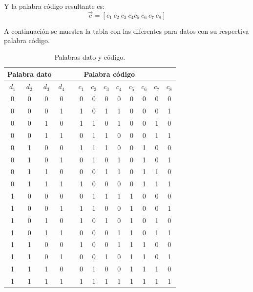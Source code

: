 \documentclass[12pt,letterpaper]{article}
\begin{document}
Y la palabra código resultante es:
\begin{equation}
    \vec{c}=[c_1 \ c_2 \ c_3 \ c_4 c_5 \ c_6 \ c_7 \ c_8]
\end{equation}

\newpage
A continuación se muestra la tabla con las diferentes para datos con su respectiva palabra 
código.
\begin{table}[ht]
    \centering
    \begin{tabular}{|c|c|c|c|c|c|c|c|c|c|c|c|c|}
    \hline
    \multicolumn{3}{c}{Palabra dato } & & \multicolumn{7}{c}{Palabra código}   \\ \hline
    $d_1$ & $d_2$ & $d_3$ & $d_4$ & & $c_1$ & $c_2$ & $c_3$ & $c_4$ & $c_5$ & $c_6$ & $c_7$ & $c_8$ \\ \hline
    0 & 0 & 0 & 0 & & 0 & 0 & 0 & 0 & 0 & 0 & 0 & 0 \\ \hline
    0 & 0 & 0 & 1 & & 1 & 0 & 1 & 1 & 0 & 0 & 0 & 1 \\ \hline
    0 & 0 & 1 & 0 & & 1 & 1 & 0 & 1 & 0 & 0 & 1 & 0 \\ \hline
    0 & 0 & 1 & 1 & & 0 & 1 & 1 & 0 & 0 & 0 & 1 & 1 \\ \hline
    0 & 1 & 0 & 0 & & 1 & 1 & 1 & 0 & 0 & 1 & 0 & 0 \\ \hline
    0 & 1 & 0 & 1 & & 0 & 1 & 0 & 1 & 0 & 1 & 0 & 1 \\ \hline
    0 & 1 & 1 & 0 & & 0 & 0 & 1 & 1 & 0 & 1 & 1 & 0 \\ \hline
    0 & 1 & 1 & 1 & & 1 & 0 & 0 & 0 & 0 & 1 & 1 & 1 \\ \hline
    1 & 0 & 0 & 0 & & 0 & 1 & 1 & 1 & 1 & 0 & 0 & 0 \\ \hline
    1 & 0 & 0 & 1 & & 1 & 1 & 0 & 0 & 1 & 0 & 0 & 1 \\ \hline
    1 & 0 & 1 & 0 & & 1 & 0 & 1 & 0 & 1 & 0 & 1 & 0 \\ \hline
    1 & 0 & 1 & 1 & & 0 & 0 & 0 & 1 & 1 & 0 & 1 & 1 \\ \hline
    1 & 1 & 0 & 0 & & 1 & 0 & 0 & 1 & 1 & 1 & 0 & 0 \\ \hline
    1 & 1 & 0 & 1 & & 0 & 0 & 1 & 0 & 1 & 1 & 0 & 1 \\ \hline
    1 & 1 & 1 & 0 & & 0 & 1 & 0 & 0 & 1 & 1 & 1 & 0 \\ \hline
    1 & 1 & 1 & 1 & & 1 & 1 & 1 & 1 & 1 & 1 & 1 & 1 \\ \hline
    \end{tabular}
    \caption{Palabras dato y código.}
    \label{Palabras dato y código.}
\end{table}
\end{document}
